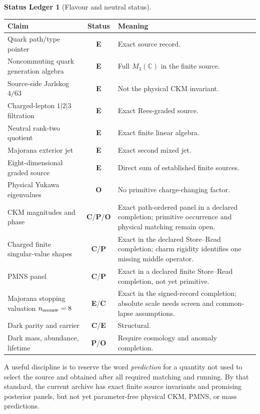 \documentclass[11pt,oneside,openany]{book}
\numberwithin{equation}{chapter}
\theoremstyle{definition}
\newtheorem{ledger}[theorem]{Status Ledger}
\theoremstyle{remark}
\newcommand{\C}{\mathbb C}
\newcommand{\statusE}{\textcolor{ExactColor}{\textbf{E}}}
\newcommand{\statusC}{\textcolor{CondColor}{\textbf{C}}}
\newcommand{\statusP}{\textcolor{PostColor}{\textbf{P}}}
\newcommand{\statusO}{\textcolor{OpenColor}{\textbf{O}}}
\begin{document}
\begin{ledger}[Flavour and neutral status]
\begin{center}
\begin{tabularx}{0.97\textwidth}{@{}p{}cX@{}}
\toprule
Claim & Status & Meaning\\
\midrule
Quark path/type pointer & \statusE & Exact source record.\\
Noncommuting quark generation algebra & \statusE & Full $M_3(\C)$ in the finite source.\\
Source-side Jarlskog $4/63$ & \statusE & Not the physical CKM invariant.\\
Charged-lepton $1|2|3$ filtration & \statusE & Exact Rees-graded source.\\
Neutral rank-two quotient & \statusE & Exact finite linear algebra.\\
Majorana exterior jet & \statusE & Exact second mixed jet.\\
Eight-dimensional graded source & \statusE & Direct sum of established finite sources.\\
Physical Yukawa eigenvalues & \statusO & No primitive charge-changing factor.\\
CKM magnitudes and phase & \statusC/\statusP/\statusO & Exact path-ordered panel in a declared completion; primitive occurrence and physical matching remain open.\\
Charged finite singular-value shapes & \statusC/\statusP & Exact in the declared Store--Read completion; charm rigidity identifies one missing middle operator.\\
PMNS panel & \statusC/\statusP & Exact in a declared finite Store--Read completion, not yet primitive.\\
Majorana stopping valuation \(n_{\rm seesaw}=8\) & \statusE/\statusC & Exact in the signed-record completion; absolute scale needs screen and common-lapse assumptions.\\
Dark parity and carrier & \statusC/\statusE & Structural.\\
Dark mass, abundance, lifetime & \statusP/\statusO & Require cosmology and anomaly completion.\\
\bottomrule
\end{tabularx}
\end{center}
\end{ledger}

A useful discipline is to reserve the word \emph{prediction} for a quantity not used to select the source and obtained after all required matching and running.  By that standard, the current archive has exact finite source invariants and promising posterior panels, but not yet parameter-free physical CKM, PMNS, or mass predictions.
\end{document}
